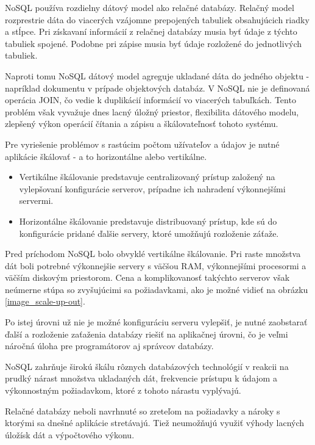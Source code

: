 	NoSQL používa rozdielny dátový model ako relačné databázy. Relačný model rozprestrie dáta do viacerých vzájomne prepojených tabuliek obsahujúcich riadky a stĺpce. Pri získavaní informácií z relačnej databázy musia byť údaje z týchto tabuliek spojené. Podobne pri zápise musia byť údaje rozložené do jednotlivých tabuliek.

	Naproti tomu NoSQL dátový model agreguje ukladané dáta do jedného objektu - napríklad dokumentu v prípade objektových databáz. V NoSQL nie je definovaná operácia JOIN, čo vedie k duplikácií informácií vo viacerých tabuľkách. Tento problém však vyvažuje dnes lacný úložný priestor, flexibilita dátového modelu, zlepšený výkon operácií čítania a zápisu a škálovateľnosť tohoto systému.
	
	Pre vyriešenie problémov s rastúcim počtom užívateľov a údajov je nutné aplikácie škálovať - a to horizontálne alebo vertikálne.
	\begin{itemize}
		\item Vertikálne škálovanie predstavuje centralizovaný prístup založený na vylepšovaní konfigurácie serverov, prípadne ich nahradení výkonnejšími servermi.
		\item Horizontálne škálovanie predstavuje distribuovaný prístup, kde sú do konfigurácie pridané ďalšie servery, ktoré umožňujú rozloženie záťaže.
	\end{itemize}

	Pred príchodom NoSQL bolo obvyklé vertikálne škálovanie. Pri raste množstva dát boli potrebné výkonnejšie servery s väčšou RAM, výkonnejšími procesormi a väčším diskovým priestorom. Cena a komplikovanosť takýchto serverov však neúmerne stúpa so zvyšujúcimi sa požiadavkami, ako je možné vidieť na obrázku \ref{image_scale-up-out}.
	
		
	Po istej úrovni už nie je možné konfiguráciu serveru vylepšiť, je nutné zaobstarať ďalší a rozloženie zaťaženia databázy riešiť na aplikačnej úrovni, čo je veľmi náročná úloha pre programátorov aj správcov databázy. 
	
	NoSQL zahrňuje širokú škálu rôznych databázových technológií v reakcii na prudký nárast množstva ukladaných dát, frekvencie prístupu k údajom a výkonnostným požiadavkom, ktoré z tohoto nárastu  vyplývajú.
	
	Relačné databázy neboli navrhnuté so zreteľom na požiadavky a nároky s ktorými sa dnešné aplikácie stretávajú. Tiež neumožňujú využiť výhody lacných úložísk dát a výpočtového výkonu.
	
